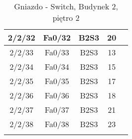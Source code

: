 \begin{center}
\begin{longtable}{|c|c|c|c|c|}
	2/2/32 & Fa0/32 & B2S3 & 20 \\ \hline
	2/2/33 & Fa0/33 & B2S3 & 13 \\ \hline
	2/2/34 & Fa0/34 & B2S3 & 15 \\ \hline
	2/2/35 & Fa0/35 & B2S3 & 17 \\ \hline
	2/2/36 & Fa0/36 & B2S3 & 18 \\ \hline
	2/2/37 & Fa0/37 & B2S3 & 21 \\ \hline
	2/2/38 & Fa0/38 & B2S3 & 23 \\ \hline
	\caption{Gniazdo - Switch, Budynek 2, piętro 2}\\
\end{longtable}
\end{center}

